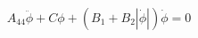 \begin{equation} \label{eq:roll_decay_equation_himeno_quadratic_c}
A_{44} \ddot{\phi} + C \phi + \left(B_{1} + B_{2} \left|{\dot{\phi}}\right|\right) \dot{\phi} = 0
\end{equation}
